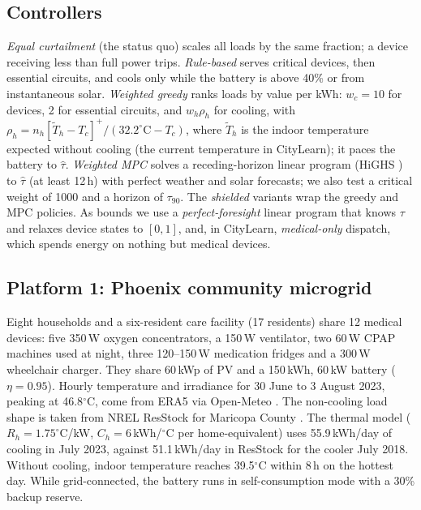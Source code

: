 \documentclass[conference]{IEEEtran}
\begin{document}
\subsection{Controllers}
\emph{Equal curtailment} (the status quo) scales all loads by the same fraction; a device receiving less than full power trips. \emph{Rule-based} serves critical devices, then essential circuits, and cools only while the battery is above 40\% or from instantaneous solar. \emph{Weighted greedy} ranks loads by value per kWh: $w_c=10$ for devices, 2 for essential circuits, and $w_h\rho_h$ for cooling, with $\rho_h = n_h[\tilde T_h - T_c]^+/(32.2^\circ\mathrm{C} - T_c)$, where $\tilde T_h$ is the indoor temperature expected without cooling (the current temperature in CityLearn); it paces the battery to $\hat\tau$. \emph{Weighted MPC} solves a receding-horizon linear program (HiGHS \cite{huangfu2018highs}) to $\hat\tau$ (at least 12\,h) with perfect weather and solar forecasts; we also test a critical weight of 1000 and a horizon of $\tau_{90}$. The \emph{shielded} variants wrap the greedy and MPC policies. As bounds we use a \emph{perfect-foresight} linear program that knows $\tau$ and relaxes device states to $[0,1]$, and, in CityLearn, \emph{medical-only} dispatch, which spends energy on nothing but medical devices.

\subsection{Platform 1: Phoenix community microgrid}
Eight households and a six-resident care facility (17 residents) share 12 medical devices: five 350\,W oxygen concentrators, a 150\,W ventilator, two 60\,W CPAP machines used at night, three 120--150\,W medication fridges and a 300\,W wheelchair charger. They share 60\,kWp of PV and a 150\,kWh, 60\,kW battery ($\eta=0.95$). Hourly temperature and irradiance for 30 June to 3 August 2023, peaking at 46.8$^\circ$C, come from ERA5 \cite{hersbach2020era5} via Open-Meteo \cite{zippenfenig2023openmeteo}. The non-cooling load shape is taken from NREL ResStock for Maricopa County \cite{wilson2022eulp}. The thermal model ($R_h=1.75^\circ$C/kW, $C_h=6$\,kWh/$^\circ$C per home-equivalent) uses 55.9\,kWh/day of cooling in July 2023, against 51.1\,kWh/day in ResStock for the cooler July 2018. Without cooling, indoor temperature reaches 39.5$^\circ$C within 8\,h on the hottest day. While grid-connected, the battery runs in self-consumption mode with a 30\% backup reserve.
\end{document}
